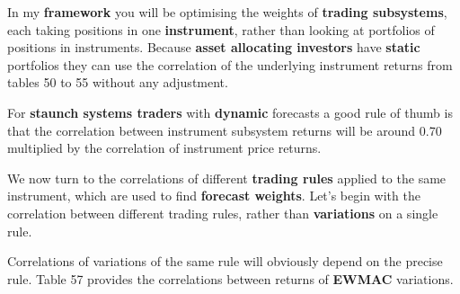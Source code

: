  \begingroup \scriptsize \setlength{\tabcolsep}{3pt} \renewcommand{\arraystretch}{1.08}
\endgroup

In my \textbf{framework} you will be optimising the weights of \textbf{trading subsystems}, each taking positions in one \textbf{instrument}, rather than looking at portfolios of positions in instruments. Because \textbf{asset allocating investors} have \textbf{static} portfolios they can use the correlation of the underlying instrument returns from tables 50 to 55 without any adjustment.

For \textbf{staunch systems traders} with \textbf{dynamic} forecasts a good rule of thumb is that the correlation between instrument subsystem returns will be around 0.70 multiplied by the correlation of instrument price returns.

We now turn to the correlations of different \textbf{trading rules} applied to the same instrument, which are used to find \textbf{forecast weights}. Let’s begin with the correlation between different trading rules, rather than \textbf{variations} on a single rule.

 

Correlations of variations of the same rule will obviously depend on the precise rule. Table 57 provides the correlations between returns of \textbf{EWMAC} variations.

